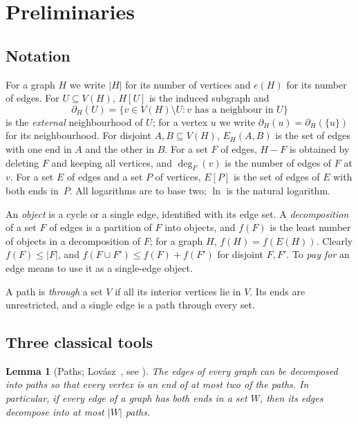 \documentclass[11pt]{article}
\newtheorem{lemma}[theorem]{Lemma}
\theoremstyle{definition}
\theoremstyle{remark}
\numberwithin{equation}{section}
\numberwithin{figure}{section}
\numberwithin{table}{section}
\newcommand{\NN}{\partial}
\begin{document}
\section{Preliminaries}\label{sec:prelim}

\subsection{Notation}
For a graph $H$ we write $|H|$ for its number of vertices and $e(H)$ for its
number of edges. For $U\subseteq V(H)$, $H[U]$ is the induced subgraph and
\[
\NN_H(U)=\{v\in V(H)\setminus U: v\text{ has a neighbour in }U\}
\]
is the \emph{external} neighbourhood of $U$; for a vertex $u$ we write
$\NN_H(u)=\NN_H(\{u\})$ for its neighbourhood. For disjoint $A,B\subseteq V(H)$,
$E_H(A,B)$ is the set of edges with one end in $A$ and the other in $B$. For a
set $F$ of edges, $H-F$ is obtained by deleting $F$ and keeping all vertices,
and $\deg_F(v)$ is the number of edges of $F$ at $v$. For a set $E$ of edges
and a set $P$ of vertices, $E[P]$ is the set of edges of $E$ with both ends
in~$P$. All logarithms are to base two; $\ln$ is the natural logarithm.

An \emph{object} is a cycle or a single edge, identified with its edge set. A
\emph{decomposition} of a set $F$ of edges is a partition of $F$ into objects,
and $f(F)$ is the least number of objects in a decomposition of $F$; for a graph
$H$, $f(H)=f(E(H))$. Clearly $f(F)\le|F|$, and $f(F\cup F')\le f(F)+f(F')$ for
disjoint $F,F'$. To \emph{pay for} an edge means to use it as a single-edge
object.

A path is \emph{through} a set $V$ if all its interior vertices lie in $V$.
Its ends are unrestricted, and a single edge is a path through every set.

\subsection{Three classical tools}

\begin{lemma}[Paths; Lov\'asz~\cite{Lov}, see {\cite[Corollary~22]{BM}}]\label{lem:lovasz}
The edges of every graph can be decomposed into paths so that every vertex is
an end of at most two of the paths. In particular, if every edge of a graph has
both ends in a set $W$, then its edges decompose into at most $|W|$ paths.
\end{lemma}
\end{document}
